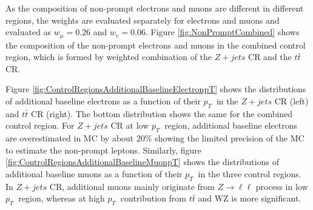 As the composition of non-prompt electrons and muons are different in different regions, the weights are evaluated separately for electrons and muons and evaluated as $w_{\mu} = 0.26$ and $w_{e} = 0.06$. Figure \ref{fig:NonPromptCombined} shows the composition of the non-prompt electrons and muons in the combined control region, which is formed by weighted combination of the $Z+jets$ CR and the $t\bar{t}$ CR.

Figure \ref{fig:ControlRegionsAdditionalBaselineElectronpT} shows the distributions of additional baseline electrons as a function of their $p_{T}~$ in the $Z+jets$ CR (left) and $t\bar{t}$ CR (right). The bottom distribution shows the same for the combined control region. For $Z+jets$ CR at low $p_{T}~$ region, additional baseline electrons are overestimated in MC by about $20\%$ showing the limited precision of the MC to estimate the non-prompt leptons. Similarly, figure \ref{fig:ControlRegionsAdditionalBaselineMuonpT} shows the distributions of additional baseline muons as a function of their $p_{T}~$ in the three control regions. In $Z+jets$ CR, additional muons mainly originate from $Z\rightarrow \ell \ell$ process in low $p_{T}~$ region, whereas at high $p_{T}~$ contribution from $t\bar{t}$ and WZ is more significant.


